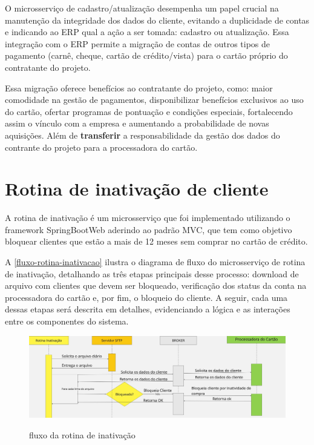 O microsserviço de cadastro/atualização desempenha um papel crucial na manutenção 
da integridade dos dados do cliente, evitando a duplicidade de contas e indicando 
ao ERP qual a ação a ser tomada: cadastro ou atualização. Essa integração com o ERP permite a migração  de contas de outros tipos de 
pagamento (carnê, cheque, cartão de crédito/vista) para o cartão próprio do 
contratante do projeto. 

Essa migração oferece benefícios ao contratante 
do projeto, como: maior comodidade na gestão de pagamentos, disponibilizar 
benefícios exclusivos ao uso do cartão, ofertar programas de pontuação e 
condições especiais, fortalecendo assim o vínculo com a empresa e aumentando a 
probabilidade de novas aquisições. Além de \textbf{transferir} a responsabilidade da gestão 
dos dados do contrante do projeto para a processadora do cartão.

\section{Rotina de inativação de cliente}

A rotina de inativação é um microsserviço que foi implementado utilizando o 
framework SpringBootWeb aderindo ao padrão MVC, que tem como objetivo bloquear 
clientes que estão a mais de 12 meses sem comprar no cartão de crédito.

A \autoref{fluxo-rotina-inativacao} ilustra o diagrama de fluxo do microsserviço 
de rotina de inativação, detalhando as três etapas principais desse processo: 
download de arquivo com clientes que devem ser bloqueado, verificação dos status 
da conta na processadora do cartão e, por fim, o bloqueio do cliente. A seguir, 
cada uma dessas etapas será descrita em detalhes, evidenciando a lógica e as 
interações entre os componentes do sistema. 

\begin{figure} [!h]
    \centering
    \caption{fluxo da rotina de inativação}
    \includegraphics[width=1\textwidth]{arquivos/imagens/fluxo-rotina-inativacao.jpg}
    \label{fluxo-rotina-inativacao}
\end{figure}

